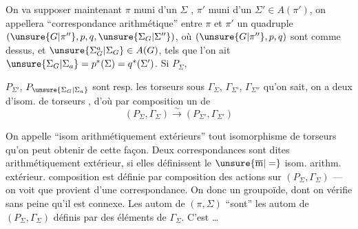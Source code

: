 
On va supposer maintenant $\pi$ muni d'un $\Sigma$ , $\pi'$ muni d'un $\Sigma'\in A(\pi')$, on appellera ``correspondance arithmétique'' entre $\pi$ et $\pi'$ un quadruple $(\unsure{G|\pi''},p,q,\unsure{\Sigma_G|\Sigma''})$, où $(\unsure{G|\pi''},p,q)$ sont comme dessus, et $\unsure{\Sigma_G^{a}|\Sigma_G}\in A(G)$, tels que l'on ait $\unsure{\Sigma_G|\Sigma_a}=p^*(\Sigma)=q^*(\Sigma')$.  Si $P_{\Sigma}$,


$P_{\Sigma'}$, $P_{\unsure{\Sigma_G|\Sigma_a}}$ sont resp. les torseurs sous $\Gamma_{\Sigma}$, $\Gamma_{\Sigma'}$, $\Gamma_{\Sigma''}$ qu'on sait, on a deux  d'isom. de torseurs
,
d'où par composition un  de
\[
(P_{\Sigma},\Gamma_{\Sigma})\xrightarrow{\sim}(P_{\Sigma'},\Gamma_{\Sigma'})
\]

On appelle ``isom arithmétiquement extérieurs''  tout isomorphisme de torseurs qu'on peut obtenir de cette façon. Deux correspondances sont dites   arithmétiquement extérieur, si elles définissent le $\unsure{\overline{\mathrm m}|=}$ isom. arithm. extérieur.  composition est définie par composition des actions sur $(P_{\Sigma},\Gamma_{\Sigma})$ --- on voit que  provient d'une correspondance. On  donc un groupoïde, dont on vérifie sans peine qu'il est connexe.  Les autom de $(\pi,\Sigma)$ ``sont'' les autom de $(P_{\Sigma},\Gamma_{\Sigma})$ définis par des éléments de $\Gamma_{\Sigma}$.  C'est \ldots

